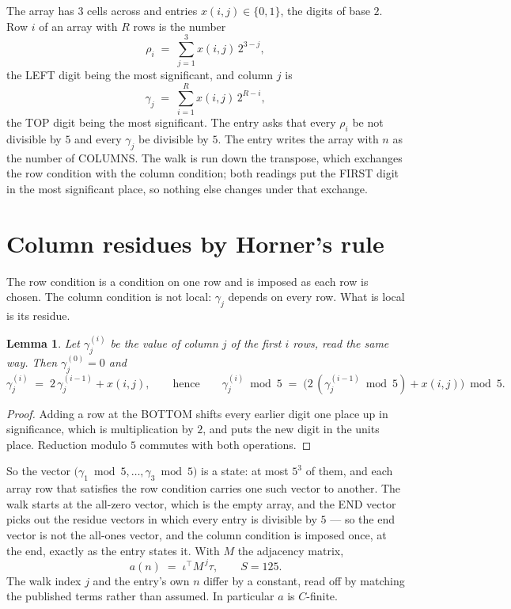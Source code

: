 \documentclass[11pt,a4paper]{article}
\theoremstyle{plain}
\newtheorem{lemma}[theorem]{Lemma}
\theoremstyle{definition}
\begin{document}
The array has $3$ cells across and entries $x(i,j)\in\{0,1\}$, the digits of
base $2$. Row $i$ of an array with $R$ rows is the number
\[
\rho_i\;=\;\sum_{j=1}^{3}x(i,j)\,2^{3-j} ,
\]
the LEFT digit being the most significant, and column $j$ is
\[
\gamma_j\;=\;\sum_{i=1}^{R}x(i,j)\,2^{R-i} ,
\]
the TOP digit being the most significant. The entry asks that every $\rho_i$ be not divisible by
$5$ and every $\gamma_j$ be divisible by $5$. The entry writes the array with $n$ as the number of COLUMNS. The walk is run down the transpose, which exchanges the row condition with the column condition; both readings put the FIRST digit in the most significant place, so nothing else changes under that exchange.


\section{Column residues by Horner's rule}

The row condition is a condition on one row and is imposed as each row is chosen. The column
condition is not local: $\gamma_j$ depends on every row. What is local is its residue.

\begin{lemma}\label{lem:horner}
Let $\gamma_j^{(i)}$ be the value of column $j$ of the first $i$ rows, read the same way.
Then $\gamma_j^{(0)}=0$ and
\[
\gamma_j^{(i)}\;=\;2\,\gamma_j^{(i-1)}+x(i,j),
\qquad\text{hence}\qquad
\gamma_j^{(i)}\bmod 5\;=\;
\bigl(2\,(\gamma_j^{(i-1)}\bmod 5)+x(i,j)\bigr)\bmod 5 .
\]
\end{lemma}

\begin{proof}
Adding a row at the BOTTOM shifts every earlier digit one place up in significance, which is
multiplication by $2$, and puts the new digit in the units place. Reduction modulo
$5$ commutes with both operations.
\end{proof}

So the vector $\bigl(\gamma_1\bmod 5,\dots,\gamma_{3}\bmod
5\bigr)$ is a state: at most $5^{3}$ of them, and each array row
that satisfies the row condition carries one such vector to another. The walk starts at the
all-zero vector, which is the empty array, and the END vector picks out the residue vectors in
which every entry is divisible by $5$ --- so the end vector is not the all-ones
vector, and the column condition is imposed once, at the end, exactly as the entry states it.
With $M$ the adjacency matrix,
\[
a(n)\;=\;\iota^{\!\top}M^{\,j}\tau ,\qquad S=125.
\]
The walk index $j$ and the entry's own $n$ differ by a constant, read off by matching the
published terms rather than assumed. In particular $a$ is $C$-finite.
\end{document}
